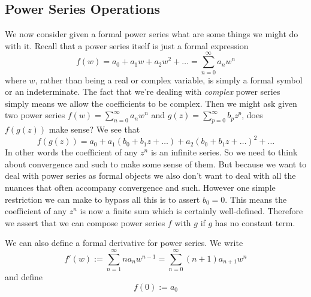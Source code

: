 \subsection{Power Series Operations}
We now consider given a formal power series what are some things we might do with it. Recall that a power series itself is just a formal expression
$$ f(w) = a_0 + a_1w + a_2 w^2 + \dots = \sum_{n = 0}^\infty a_n w^n  $$
where $w$, rather than being a real or complex variable, is simply a formal symbol or an indeterminate. The fact that we're dealing with \textit{complex} power series simply means we allow the coefficients to be complex. Then we might ask given two power series $f(w) = \sum_{n = 0}^\infty a_n w^n$ and $g(z) = \sum_{p = 0}^\infty b_p z^p$, does $f(g(z))$ make sense? We see that
$$ f(g(z)) = a_0 + a_1(b_0 + b_1 z + \dots) + a_2(b_0 + b_1 z + \dots)^2 + \dots $$
In other words the coefficient of any $z^n$ is an infinite series. So we need to think about convergence and such to make some sense of them. But because we want to deal with power series as formal objects we also don't want to deal with all the nuances that often accompany convergence and such. However one simple restriction we can make to bypass all this is to assert $b_0 = 0$. This means the coefficient of any $z^n$ is now a finite sum which is certainly well-defined. Therefore we assert that we can compose power series $f$ with $g$ if $g$ has no constant term.

We can also define a formal derivative for power series. We write
$$f'(w) := \sum_{n = 1}^\infty n a_n w^{n - 1} = \sum_{n = 0}^\infty (n + 1) a_{n + 1} w^n$$
and define
$$ f(0) := a_0 $$

